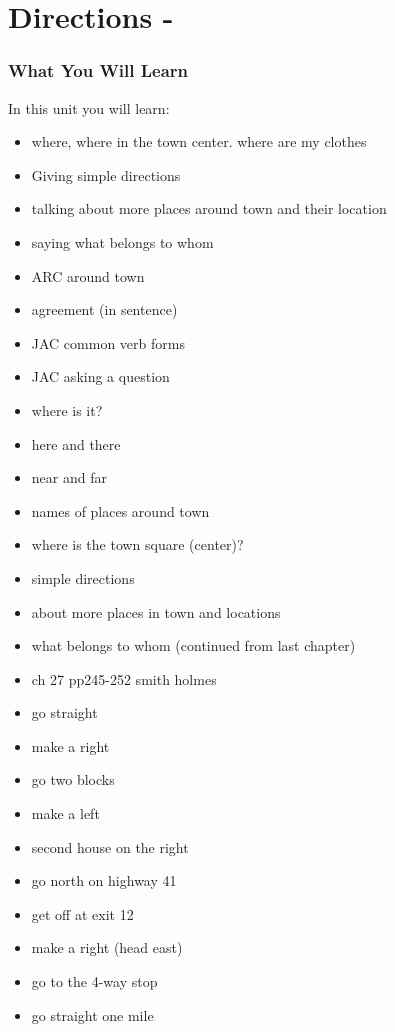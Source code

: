 \chapter*{Directions - }
\subsection{What You Will Learn}
In this unit you will learn:
\begin{itemize}
\item where, where in the town center. where are my clothes
\item Giving simple directions
\item talking about more places around town and their location
\item saying what belongs to whom
\item ARC around town
\item agreement (in sentence)
\item JAC common verb forms
\item JAC asking a question
\item where is it?
\item here and there
\item near and far
\item names of places around town
\item where is the town square (center)?
\item simple directions
\item about more places in town and locations
\item what belongs to whom (continued from last chapter)
\item ch 27 pp245-252 smith holmes
\item go straight
\item make a right
\item go two blocks
\item make a left
\item second house on the right
\item go north on highway 41
\item get off at exit 12
\item make a right (head east)
\item go to the 4-way stop
\item go straight one mile
\end{itemize}\newpage

